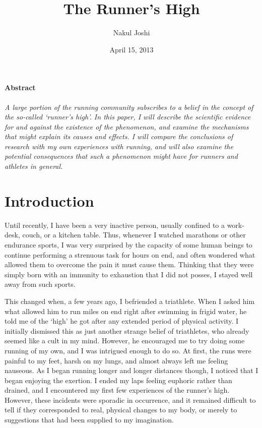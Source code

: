 \documentclass[twocolumn]{article}
\title{The Runner's High}
\author{Nakul Joshi}
\date{April 15, 2013}
\begin{document}
\maketitle

\paragraph{Abstract} \textit{A large portion of the running community subscribes to a belief in the concept of the so-called `runner's high'. In this paper, I will describe the scientific evidence for and against the existence of the phenomenon, and examine the mechanisms that might explain its causes and effects. I will compare the conclusions of research with my own experiences with running, and will also examine the potential consequences that such a phenomenon might have for runners and athletes in general.}

\section{Introduction}

	Until recently, I have been a very inactive person, usually confined to a work-desk, couch, or a kitchen table. Thus, whenever I watched marathons or other endurance sports, I was very surprised by the capacity of some human beings to continue performing a strenuous task for hours on end, and often wondered what allowed them to overcome the pain it must cause them. Thinking that they were simply born with an immunity to exhaustion that I did not posses, I stayed well away from such sports.
	
	This changed when, a few years ago, I befriended a triathlete. When I asked him what allowed him to run miles on end right after swimming in frigid water, he told me of the `high' he got after any extended period of physical activity. I initially dismissed this as just another strange belief of triathletes, who already seemed like a cult in my mind. However, he encouraged me to try doing some running of my own, and I was intrigued enough to do so. At first, the runs were painful to my feet, harsh on my lungs, and almost always left me feeling nauseous. As I began running longer and longer distances though, I noticed that I began enjoying the exertion. I ended my laps feeling euphoric rather than drained, and I encountered my first few experiences of the runner's high. However, these incidents were sporadic in occurrence, and it remained difficult to tell if they corresponded to real, physical changes to my body, or merely to suggestions that had been supplied to my imagination.
\end{document}
